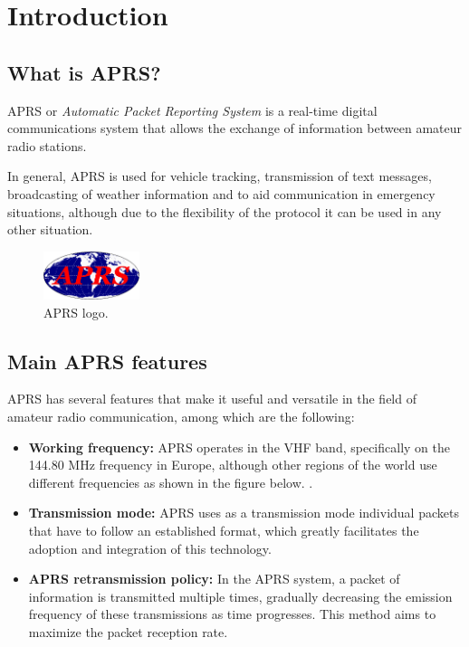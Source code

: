 \chapter*{Introduction}
\label{cap:introduction}

\section{What is APRS?}

APRS or \textit{Automatic Packet Reporting System} is a real-time digital communications system that allows the exchange of information between amateur radio stations.

In general, APRS is used for vehicle tracking, transmission of text messages, broadcasting of weather information and to aid communication in emergency situations, although due to the flexibility of the protocol it can be used in any other situation.

\begin{figure}[h!]
	\centering
	\includegraphics[width=0.25\textwidth]{Imagenes/Chapter_1/APRS_logo.png}
	\caption{APRS logo.}
	\label{fig:aprs-logo-en}
\end{figure}

\section{Main APRS features}

APRS has several features that make it useful and versatile in the field of amateur radio communication, among which are the following:
\begin{itemize}
	\item \textbf{Working frequency:} APRS operates in the VHF band, specifically on the 144.80 MHz frequency in Europe, although other regions of the world use different frequencies as shown in the figure below. .
	\item \textbf{Transmission mode:} APRS uses as a transmission mode individual packets that have to follow an established format, which greatly facilitates the adoption and integration of this technology.
	\item \textbf{APRS retransmission policy:} In the APRS system, a packet of information is transmitted multiple times, gradually decreasing the emission frequency of these transmissions as time progresses. This method aims to maximize the packet reception rate.
\end{itemize}

